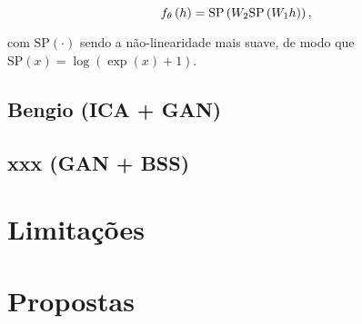 \begin{equation}
    f_{\theta}\left(h\right) = \text{SP}\left(W_{2}\text{SP}\left(W_{1}h\right)\right),
    \label{eq:08461671_gan_arch}
    \vspace{0.2cm}
\end{equation}

\noindent com $\text{SP}\left(\cdot\right)$ sendo a não-linearidade mais suave, de modo que $\text{SP}\left(x\right) = \log\left(\exp\left(x\right) +1 \right)$.



\subsection{Bengio (ICA + GAN)}
\label{subsec:gan_for_bss_ica_gan}



\subsection{xxx (GAN + BSS)}
\label{subsec:gan_for_bss_gan_bss}



\section{Limitações}
\label{sec:gan_for_bss_limitacoes}



\section{Propostas}
\label{sec:gan_for_bss_propositions}
